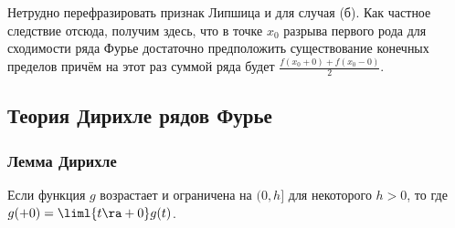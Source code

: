 \documentclass[a4paper]{article}
\begin{document}
Нетрудно перефразировать признак Липшица и для случая (б). Как
частное следствие отсюда, получим здесь, что в точке $x_0$ разрыва
первого рода для сходимости ряда Фурье достаточно предположить
существование конечных пределов  причём
на этот раз суммой ряда будет $\frac{f(x_0+0) + f(x_0-0)}2$.

\subsection{Теория Дирихле рядов Фурье}
\subsubsection{Лемма Дирихле}

\begin{theorem}
Если функция $g$ возрастает и ограничена на $(0,h]$ для некоторого
$h>0$, то  где $g(+0) = \liml{t\ra+0}g(t)$.
\end{theorem}
\end{document}
